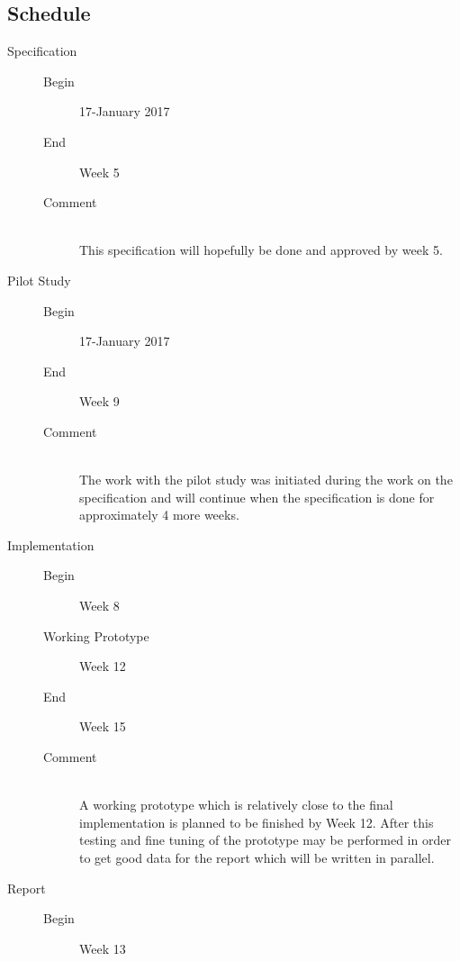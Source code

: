 \documentclass[a4paper,11pt]{report}
\begin{document}
\subsection*{Schedule}
\begin{description}
    \item [Specification] \hfill
        \begin{description}
            \item[Begin] 17-January 2017
            \item[End] Week 5
            \item[Comment]\hfill \\
                This specification will hopefully be done and approved by 
                week 5.
        \end{description}

    \item[Pilot Study] \hfill
        \begin{description}
            \item[Begin] 17-January 2017
            \item[End] Week 9
            \item[Comment]\hfill \\
                The work with the pilot study was initiated during the work on 
                the specification and will continue when the specification is 
                done for approximately 4 more weeks.
        \end{description}
    \item[Implementation] \hfill
        \begin{description}
            \item[Begin] Week 8
            \item[Working Prototype] Week 12
            \item[End] Week 15
            \item[Comment]\hfill \\
                A working prototype which is relatively close to the final 
                implementation is planned to be finished by Week 12. After this
                testing and fine tuning of the prototype may be performed in 
                order to get good data for the report which will be written 
                in parallel.
        \end{description}
    \item[Report] \hfill
        \begin{description}
            \item[Begin] Week 13

\end{description}
\end{description}
\end{document}
